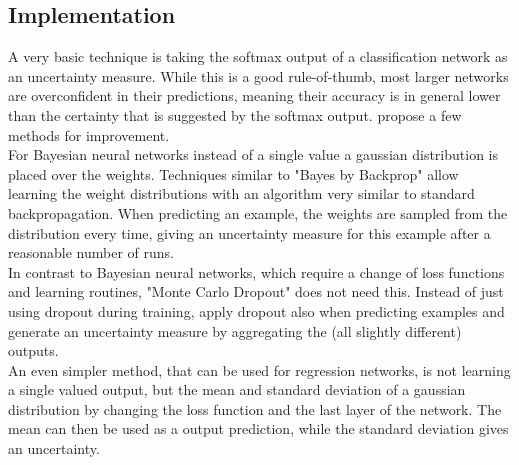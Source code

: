 \documentclass[thesis.tex]{subfiles}
\begin{document}
\subsection{Implementation}
A very basic technique is taking the softmax output of a classification network as an uncertainty measure. While this is a good rule-of-thumb, most larger networks are overconfident in their predictions, meaning their accuracy is in general lower than the certainty that is suggested by the softmax output. \cite{guo2017calibration} propose a few methods for improvement. \\
For Bayesian neural networks instead of a single value a gaussian distribution is placed over the weights. Techniques similar to "Bayes by Backprop" \cite{blundell2015weight} allow learning the weight distributions with an algorithm very similar to standard backpropagation. When predicting an example, the weights are sampled from the distribution every time, giving an uncertainty measure for this example after a reasonable number of runs.\\
In contrast to Bayesian neural networks, which require a change of loss functions and learning routines, "Monte Carlo Dropout" does not need this. Instead of just using dropout during training, \cite{gal2016dropout} apply dropout also when predicting examples and generate an uncertainty measure by aggregating the (all slightly different) outputs.\\
An even simpler method, that can be used for regression networks, is not learning a single valued output, but the mean and standard deviation of a gaussian distribution by changing the loss function and the last layer of the network. The mean can then be used as a output prediction, while the standard deviation gives an uncertainty. 



\subfilebib %
\end{document}
